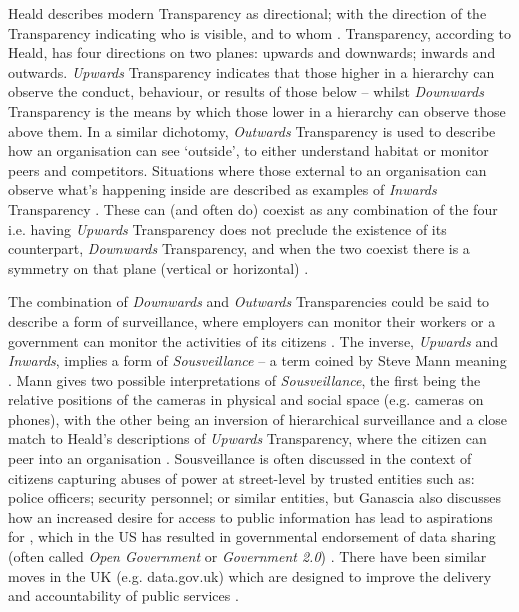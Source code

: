
Heald describes modern Transparency as directional; with the direction of the Transparency indicating who is visible, and to whom \cite{heald_varieties_2006}. Transparency, according to Heald, has four directions on two planes: upwards and downwards; inwards and outwards. \textit{Upwards} Transparency indicates that those higher in a hierarchy can observe the conduct, behaviour, or results of those below -- whilst \textit{Downwards} Transparency is the means by which those lower in a hierarchy can observe those above them. In a similar dichotomy, \textit{Outwards} Transparency is used to describe how an organisation can see `outside', to either understand habitat or monitor peers and competitors. Situations where those external to an organisation can observe what's happening inside are described as examples of \textit{Inwards} Transparency \cite{heald_varieties_2006}. These can (and often do) coexist as any combination of the four i.e. having \textit{Upwards} Transparency does not preclude the existence of its counterpart, \textit{Downwards} Transparency, and when the two coexist there is a symmetry on that plane (vertical or horizontal) \cite{heald_varieties_2006}.

The combination of \textit{Downwards} and \textit{Outwards} Transparencies could be said to describe a form of surveillance, where employers can monitor their workers or a government can monitor the activities of its citizens \cite{heald_varieties_2006}. The inverse, \textit{Upwards} and \textit{Inwards}, implies a form of \textit{Sousveillance} -- a term coined by Steve Mann meaning  \cite{mann_sousveillance:_2004}. Mann gives two possible interpretations of \textit{Sousveillance}, the first being the relative positions of the cameras in physical and social space (e.g. cameras on phones), with the other being an inversion of hierarchical surveillance and a close match to Heald's descriptions of \textit{Upwards} Transparency, where the citizen can peer into an organisation \cite{mann_sousveillance:_2004, heald_varieties_2006}. Sousveillance is often discussed in the context of citizens capturing abuses of power at street-level by trusted entities such as: police officers; security personnel; or similar entities, but Ganascia also discusses how an increased desire for access to public information has lead to aspirations for , which in the US has resulted in governmental endorsement of data sharing (often called \textit{Open Government} or \textit{Government 2.0}) \cite{ganascia_generalized_2010}. There have been similar moves in the UK (e.g. data.gov.uk) which are designed to improve the delivery and accountability of public services \cite{shadbolt_linked_2012}.

